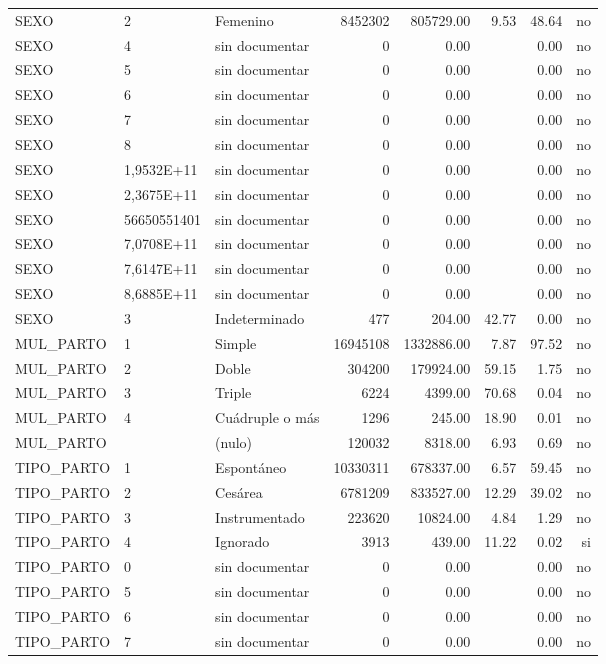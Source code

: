 \begin{tabular}{lllrrrrr}
SEXO & 2 & Femenino & 8452302 & 805729.00 & 9.53 & 48.64 & no \\
SEXO & 4 & sin documentar & 0 & 0.00 &  & 0.00 & no \\
SEXO & 5 & sin documentar & 0 & 0.00 &  & 0.00 & no \\
SEXO & 6 & sin documentar & 0 & 0.00 &  & 0.00 & no \\
SEXO & 7 & sin documentar & 0 & 0.00 &  & 0.00 & no \\
SEXO & 8 & sin documentar & 0 & 0.00 &  & 0.00 & no \\
SEXO & 1,9532E+11 & sin documentar & 0 & 0.00 &  & 0.00 & no \\
SEXO & 2,3675E+11 & sin documentar & 0 & 0.00 &  & 0.00 & no \\
SEXO & 56650551401 & sin documentar & 0 & 0.00 &  & 0.00 & no \\
SEXO & 7,0708E+11 & sin documentar & 0 & 0.00 &  & 0.00 & no \\
SEXO & 7,6147E+11 & sin documentar & 0 & 0.00 &  & 0.00 & no \\
SEXO & 8,6885E+11 & sin documentar & 0 & 0.00 &  & 0.00 & no \\
SEXO & 3 & Indeterminado & 477 & 204.00 & 42.77 & 0.00 & no \\
MUL\_PARTO & 1 & Simple & 16945108 & 1332886.00 & 7.87 & 97.52 & no \\
MUL\_PARTO & 2 & Doble & 304200 & 179924.00 & 59.15 & 1.75 & no \\
MUL\_PARTO & 3 & Triple & 6224 & 4399.00 & 70.68 & 0.04 & no \\
MUL\_PARTO & 4 & Cuádruple o más & 1296 & 245.00 & 18.90 & 0.01 & no \\
MUL\_PARTO &  & (nulo) & 120032 & 8318.00 & 6.93 & 0.69 & no \\
TIPO\_PARTO & 1 & Espontáneo & 10330311 & 678337.00 & 6.57 & 59.45 & no \\
TIPO\_PARTO & 2 & Cesárea & 6781209 & 833527.00 & 12.29 & 39.02 & no \\
TIPO\_PARTO & 3 & Instrumentado & 223620 & 10824.00 & 4.84 & 1.29 & no \\
TIPO\_PARTO & 4 & Ignorado & 3913 & 439.00 & 11.22 & 0.02 & si \\
TIPO\_PARTO & 0 & sin documentar & 0 & 0.00 &  & 0.00 & no \\
TIPO\_PARTO & 5 & sin documentar & 0 & 0.00 &  & 0.00 & no \\
TIPO\_PARTO & 6 & sin documentar & 0 & 0.00 &  & 0.00 & no \\
TIPO\_PARTO & 7 & sin documentar & 0 & 0.00 &  & 0.00 & no \\

\end{tabular}
